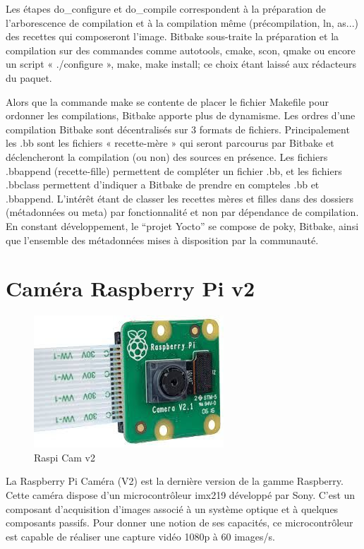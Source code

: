 Les étapes do\_configure et do\_compile correspondent à la préparation de l'arborescence
de compilation et à la compilation même (précompilation, ln, as...)
des recettes qui composeront l’image. Bitbake sous-traite la préparation et la
compilation sur des commandes comme autotools, cmake, scon, qmake ou encore un
script « ./configure », make, make install; ce choix étant laissé aux rédacteurs du paquet.

Alors que la commande make se contente de placer le fichier Makefile pour ordonner les
compilations, Bitbake apporte plus de dynamisme. Les ordres d’une compilation Bitbake
sont décentralisés sur 3 formats de fichiers. Principalement les .bb sont les fichiers «
recette-mère » qui seront parcourus par Bitbake et déclencheront la compilation (ou non)
des sources en présence. Les fichiers .bbappend (recette-fille) permettent de compléter un
fichier .bb, et les fichiers .bbclass permettent d’indiquer a Bitbake de prendre en compteles
.bb et .bbappend. L'intérêt étant de classer les recettes mères et filles dans des
dossiers (métadonnées ou meta) par fonctionnalité et non par dépendance de compilation.
En constant développement, le “projet Yocto” se compose de poky, Bitbake, ainsi que
l’ensemble des métadonnées mises à disposition par la communauté.

\section{Caméra Raspberry Pi v2}

\begin{figure}[!htb]
    \centering
    \includegraphics[trim={0cm 0cm 0cm 0cm},clip,scale=0.4]{Figures/camrpi.png}
    \decoRule
    \caption{Raspi Cam v2} \label{fig:camrpi}
\end{figure}

La Raspberry Pi Caméra (V2) est la dernière version de la gamme Raspberry. Cette
caméra dispose d’un microcontrôleur imx219 développé par Sony. C’est un composant
d’acquisition d’images associé à un système optique et à quelques composants passifs.
Pour donner une notion de ses capacités, ce microcontrôleur est capable de réaliser une
capture vidéo 1080p à 60 images/s. \medskip

